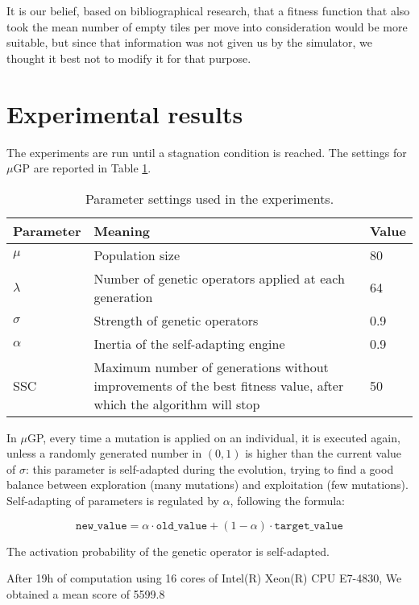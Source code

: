 \documentclass[11pt,twocolumn]{article}
\begin{document}
It is our belief, based on bibliographical research, that a fitness function that also took the mean number of empty tiles per move into consideration would be more suitable, but since that information was not given us by the simulator, we thought it best not to modify it for that purpose.



\section{Experimental results}
The experiments are run until a stagnation condition is reached. The settings for $\mu$GP are reported in Table \ref{table:settings}.

\begin{table}[htb]
\centering
\caption{Parameter settings used in the experiments.}
\label{table:settings}
{\scriptsize
\begin{tabular}{|l|p{4.3cm}|p{1cm}|}
\hline
{\bf Parameter}  & {\bf Meaning} 			& {\bf Value}\\ \hline
$\mu$            & Population size         & 80                                 \\ \hline
$\lambda$        & Number of genetic operators applied
 at each generation         & 64                                 \\ \hline
$\sigma$         & Strength of genetic operators         & 0.9                                \\ \hline
$\alpha$ & Inertia of the self-adapting engine       & 0.9                                \\ \hline
SSC & Maximum number of generations
 without improvements of the  
 best fitness value, after which 
  the algorithm will stop & 50 \\ \hline
\end{tabular}
}

\end{table}

In $\mu$GP, every time a mutation is applied on an individual, it is executed again, unless a randomly generated number in $(0,1)$ is higher than the current value of $\sigma$: this parameter is self-adapted during the evolution, trying to find a good balance between exploration (many mutations) and exploitation (few mutations). Self-adapting of parameters is regulated by $\alpha$, following the formula:



\begin{equation}
\texttt{new\_value} = \alpha \cdot \texttt{old\_value} + (1 - \alpha) \cdot \texttt{target\_value}
\end{equation}

The activation probability of the genetic operator is self-adapted. 

After 19h of computation using 16 cores of  Intel(R) Xeon(R) CPU E7-4830, We obtained a mean score of 5599.8


{\scriptsize



}
\end{document}

